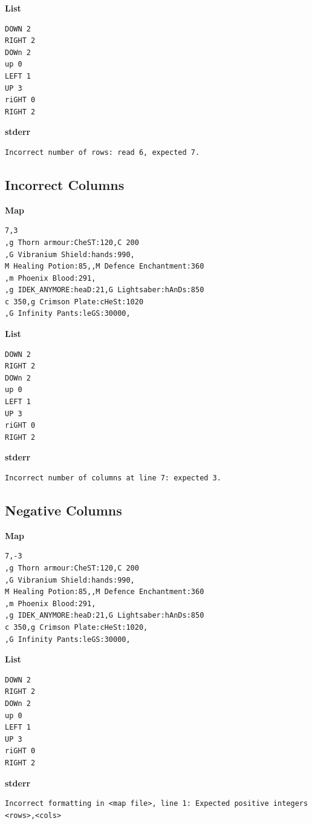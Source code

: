 \documentclass{article}
\begin{document}
\textbf{List}
\begin{lstlisting}
DOWN 2
RIGHT 2
DOWn 2
up 0
LEFT 1
UP 3
riGHT 0
RIGHT 2
\end{lstlisting}
\pagebreak

\textbf{stderr}
\begin{lstlisting}
Incorrect number of rows: read 6, expected 7.
\end{lstlisting}

\subsection{Incorrect Columns}

\quad \textbf{Map}
\begin{lstlisting}
7,3
,g Thorn armour:CheST:120,C 200
,G Vibranium Shield:hands:990,
M Healing Potion:85,,M Defence Enchantment:360
,m Phoenix Blood:291,
,g IDEK_ANYMORE:heaD:21,G Lightsaber:hAnDs:850
c 350,g Crimson Plate:cHeSt:1020
,G Infinity Pants:leGS:30000,
\end{lstlisting}

\textbf{List}
\begin{lstlisting}
DOWN 2
RIGHT 2
DOWn 2
up 0
LEFT 1
UP 3
riGHT 0
RIGHT 2
\end{lstlisting}
\pagebreak

\textbf{stderr}
\begin{lstlisting}
Incorrect number of columns at line 7: expected 3.
\end{lstlisting}

\subsection{Negative Columns}

\quad \textbf{Map}
\begin{lstlisting}
7,-3
,g Thorn armour:CheST:120,C 200
,G Vibranium Shield:hands:990,
M Healing Potion:85,,M Defence Enchantment:360
,m Phoenix Blood:291,
,g IDEK_ANYMORE:heaD:21,G Lightsaber:hAnDs:850
c 350,g Crimson Plate:cHeSt:1020,
,G Infinity Pants:leGS:30000,
\end{lstlisting}

\textbf{List}
\begin{lstlisting}
DOWN 2
RIGHT 2
DOWn 2
up 0
LEFT 1
UP 3
riGHT 0
RIGHT 2
\end{lstlisting}
\pagebreak

\textbf{stderr}
\begin{lstlisting}
Incorrect formatting in <map file>, line 1: Expected positive integers <rows>,<cols>
\end{lstlisting}
\end{document}
